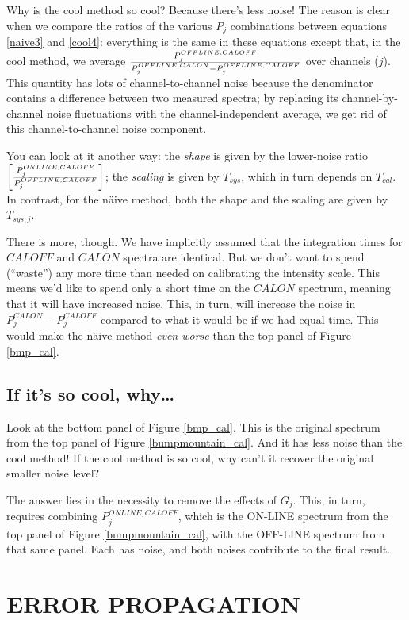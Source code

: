 \documentclass[preprint]{aastex}
\begin{document}
	Why is the cool method so cool? Because there's less noise! The
reason is clear when we compare the ratios of the various $P_j$
combinations between equations \ref{naive3} and \ref{cool4}: everything
is the same in these equations except that, in the cool method, we
average ${P_j^{OFFLINE,CALOFF} \over  P_j^{OFFLINE,CALON} - P_j^{OFFLINE,CALOFF}}$ over
channels ($j$). This quantity has lots of channel-to-channel noise
because the denominator contains a difference between two measured
spectra; by replacing its channel-by-channel noise fluctuations with the
channel-independent average, we get rid of this channel-to-channel noise
component. 

	You can look at it another way: the {\it shape} is given by the
lower-noise ratio $\left[ {P_j^{ONLINE, CALOFF} \over P_j^{OFFLINE, CALOFF}} 
\right]$; the {\it scaling} is given by $T_{sys}$, which in turn depends
on $T_{cal}$. In contrast, for the n\"aive method, both the shape and
the scaling are given by $T_{sys,j}$.

	There is more, though. We have implicitly assumed that the
integration times for $CALOFF$ and $CALON$ spectra are identical. But we
don't want to spend (``waste'') any more time than needed on calibrating
the intensity scale. This means we'd like to spend only a short time on
the $CALON$ spectrum, meaning that it will have increased noise. This,
in turn, will increase the noise in $P_j^{CALON} - P_j^{CALOFF}$
compared to what it would be if we had equal time. This would make the
n\"aive method {\it even worse} than the top panel of Figure
\ref{bmp_cal}.

\subsection{If it's so cool, why\dots}

	Look at the bottom panel of Figure \ref{bmp_cal}. This is the
original spectrum from the top panel of Figure \ref{bumpmountain_cal}.
And it has less noise than the cool method! If the cool method is so
cool, why can't it recover the original smaller noise level?

	The answer lies in the necessity to remove the effects of $G_j$.
This, in turn, requires combining $P_j^{ONLINE, CALOFF}$, which is the
ON-LINE spectrum from the top panel of Figure \ref{bumpmountain_cal},
with the OFF-LINE spectrum from that same panel. Each has noise, and
both noises contribute to the final result.

\section{ERROR PROPAGATION}
\end{document}
